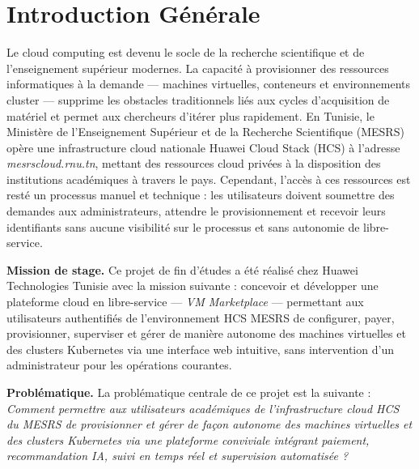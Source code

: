 \chapter*{Introduction Générale}

Le cloud computing est devenu le socle de la recherche scientifique et de
l'enseignement supérieur modernes. La capacité à provisionner des ressources
informatiques à la demande --- machines virtuelles, conteneurs et environnements
cluster --- supprime les obstacles traditionnels liés aux cycles d'acquisition de
matériel et permet aux chercheurs d'itérer plus rapidement. En Tunisie, le Ministère
de l'Enseignement Supérieur et de la Recherche Scientifique (MESRS) opère une
infrastructure cloud nationale Huawei Cloud Stack (HCS) à l'adresse
\textit{mesrscloud.rnu.tn}, mettant des ressources cloud privées à la disposition
des institutions académiques à travers le pays. Cependant, l'accès à ces ressources
est resté un processus manuel et technique : les utilisateurs doivent soumettre des
demandes aux administrateurs, attendre le provisionnement et recevoir leurs identifiants
sans aucune visibilité sur le processus et sans autonomie de libre-service.

\textbf{Mission de stage.} Ce projet de fin d'études a été réalisé chez Huawei
Technologies Tunisie avec la mission suivante : concevoir et développer une plateforme
cloud en libre-service --- \textit{VM Marketplace} --- permettant aux utilisateurs
authentifiés de l'environnement HCS MESRS de configurer, payer, provisionner,
superviser et gérer de manière autonome des machines virtuelles et des clusters
Kubernetes via une interface web intuitive, sans intervention d'un administrateur pour
les opérations courantes.

\textbf{Problématique.} La problématique centrale de ce projet est la suivante :
\textit{Comment permettre aux utilisateurs académiques de l'infrastructure cloud HCS
du MESRS de provisionner et gérer de façon autonome des machines virtuelles et des
clusters Kubernetes via une plateforme conviviale intégrant paiement, recommandation
IA, suivi en temps réel et supervision automatisée ?}

